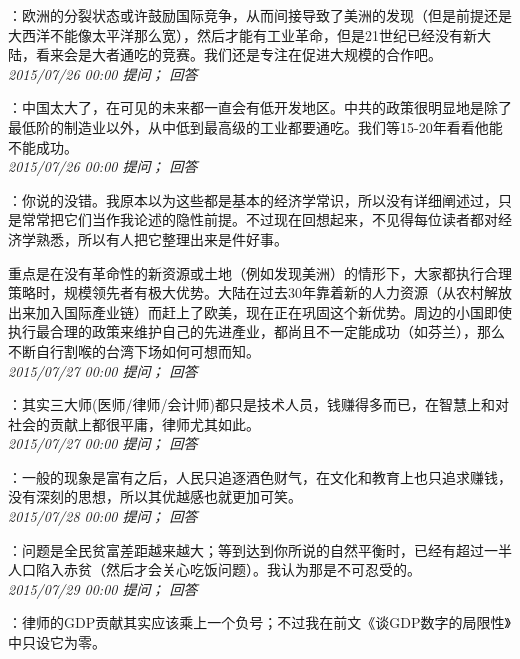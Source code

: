 \documentclass[twocolumn]{ctexart}
\begin{document}
：欧洲的分裂状态或许鼓励国际竞争，从而间接导致了美洲的发现（但是前提还是大西洋不能像太平洋那么宽），然后才能有工业革命，但是21世纪已经没有新大陆，看来会是大者通吃的竞赛。我们还是专注在促进大规模的合作吧。\\

\textit{\hfill\noindent\small 2015/07/26 00:00 提问； 回答}

：中国太大了，在可见的未来都一直会有低开发地区。中共的政策很明显地是除了最低阶的制造业以外，从中低到最高级的工业都要通吃。我们等15-20年看看他能不能成功。\\

\textit{\hfill\noindent\small 2015/07/26 00:00 提问； 回答}

：你说的没错。我原本以为这些都是基本的经济学常识，所以没有详细阐述过，只是常常把它们当作我论述的隐性前提。不过现在回想起来，不见得每位读者都对经济学熟悉，所以有人把它整理出来是件好事。

重点是在没有革命性的新资源或土地（例如发现美洲）的情形下，大家都执行合理策略时，规模领先者有极大优势。大陆在过去30年靠着新的人力资源（从农村解放出来加入国际產业链）而赶上了欧美，现在正在巩固这个新优势。周边的小国即使执行最合理的政策来维护自己的先进產业，都尚且不一定能成功（如芬兰），那么不断自行割喉的台湾下场如何可想而知。\\

\textit{\hfill\noindent\small 2015/07/27 00:00 提问； 回答}

：其实三大师(医师/律师/会计师)都只是技术人员，钱赚得多而已，在智慧上和对社会的贡献上都很平庸，律师尤其如此。\\

\textit{\hfill\noindent\small 2015/07/27 00:00 提问； 回答}

：一般的现象是富有之后，人民只追逐酒色财气，在文化和教育上也只追求赚钱，没有深刻的思想，所以其优越感也就更加可笑。\\

\textit{\hfill\noindent\small 2015/07/28 00:00 提问； 回答}

：问题是全民贫富差距越来越大；等到达到你所说的自然平衡时，已经有超过一半人口陷入赤贫（然后才会关心吃饭问题）。我认为那是不可忍受的。\\

\textit{\hfill\noindent\small 2015/07/29 00:00 提问； 回答}

：律师的GDP贡献其实应该乘上一个负号；不过我在前文《谈GDP数字的局限性》中只设它为零。\\
\end{document}
